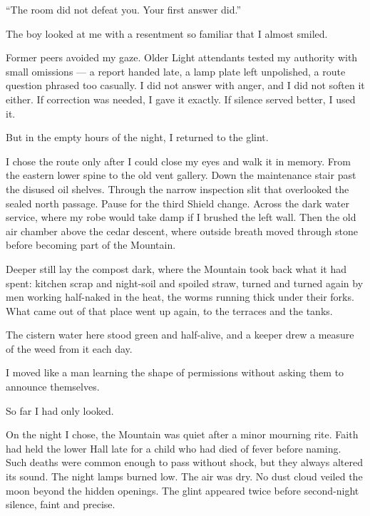 ``The room did not defeat you. Your first answer did.''\par

The boy looked at me with a resentment so familiar that I almost smiled.\par

Former peers avoided my gaze. Older Light attendants tested my authority with small omissions --- a report handed late, a lamp plate left unpolished, a route question phrased too casually. I did not answer with anger, and I did not soften it either. If correction was needed, I gave it exactly. If silence served better, I used it.\par

But in the empty hours of the night, I returned to the glint.\par

I chose the route only after I could close my eyes and walk it in memory. From the eastern lower spine to the old vent gallery. Down the maintenance stair past the disused oil shelves. Through the narrow inspection slit that overlooked the sealed north passage. Pause for the third Shield change. Across the dark water service, where my robe would take damp if I brushed the left wall. Then the old air chamber above the cedar descent, where outside breath moved through stone before becoming part of the Mountain.\par

Deeper still lay the compost dark, where the Mountain took back what it had spent: kitchen scrap and night-soil and spoiled straw, turned and turned again by men working half-naked in the heat, the worms running thick under their forks. What came out of that place went up again, to the terraces and the tanks.\par

The cistern water here stood green and half-alive, and a keeper drew a measure of the weed from it each day.\par

I moved like a man learning the shape of permissions without asking them to announce themselves.\par

So far I had only looked.\par

On the night I chose, the Mountain was quiet after a minor mourning rite. Faith had held the lower Hall late for a child who had died of fever before naming. Such deaths were common enough to pass without shock, but they always altered its sound. The night lamps burned low. The air was dry. No dust cloud veiled the moon beyond the hidden openings. The glint appeared twice before second-night silence, faint and precise.\par

